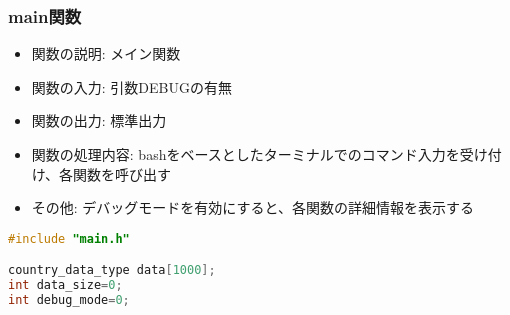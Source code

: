 \documentclass[a4paper,11pt]{jsarticle}
\begin{document}
\subsubsection*{main関数}
\begin{itemize}
    \item 関数の説明: メイン関数
    \item 関数の入力: 引数DEBUGの有無
    \item 関数の出力: 標準出力
    \item 関数の処理内容: bashをベースとしたターミナルでのコマンド入力を受け付け、各関数を呼び出す
    \item その他: デバッグモードを有効にすると、各関数の詳細情報を表示する
\end{itemize}
\begin{lstlisting}[caption=main関数のコード, label=main, language=C]
#include "main.h"

country_data_type data[1000];
int data_size=0;
int debug_mode=0;


\end{lstlisting}
\end{document}

